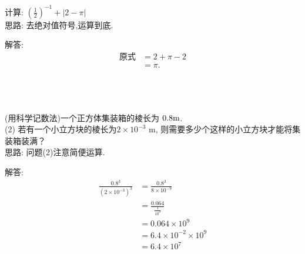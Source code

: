 \begin{comment}
\item {
    (注意: 除号使用分数形式) 已知$10^{-m}=a, 10^{-n}=b$($m, n$是整数),求$10^{2m-3n}$的值(用含有$a, b$的代数式表示).
    \\ \\ \\
}
\end{comment}

\begin{comment}
\item {
    已知$2^x=3, 2^y=6, 2^z=12$,判断下列有关$x, y, z$的数量关系式的对错.\\
    (1) $x+z=2y$\\
    (2) $x+y+3=2z$\\
    (3) $4x=z$\\
    (4) $x+1=y$
    \\ \\
}
\end{comment}

\item {
    计算: $ (\frac{1}{2})^{-1} + \lvert 2-\pi \rvert $
    \ifshowSolution
    \fangsong{}
    \\
    思路: 去绝对值符号,运算到底.

    解答: 
    \begin{align*}
        \mbox{原式} &= 2 + \pi - 2\\
        &= \pi.
    \end{align*}
    \else
        \\ \\ \\
    \fi
}

\begin{comment}
\item {
    已知$(x+2)^{x+5}=1$, 求$x$.
    \\ \\ \\
}
\end{comment}

\item {
    (用科学记数法)一个正方体集装箱的棱长为 $0.8 \rm{m}$.\\
    (2) 若有一个小立方块的棱长为$2\times 10^{-3} $ m, 则需要多少个这样的小立方块才能将集装箱装满？
    \ifshowSolution
    \fangsong{}
    \\
    思路: 问题(2)注意简便运算.

    解答:
    \begin{align*}
        \frac{0.8^3} {(2\times 10^{-3})^3} &= \frac{0.8^3} {8\times 10^{-9}}\\
        &= \frac{0.064} {\frac{1}{10^9}}\\
        &= 0.064\times 10^9\\
        &= 6.4\times 10^{-2}\times 10^9\\
        &= 6.4\times 10^7\\
    \end{align*}
    \else
        \\ \\ \\
    \fi
}

